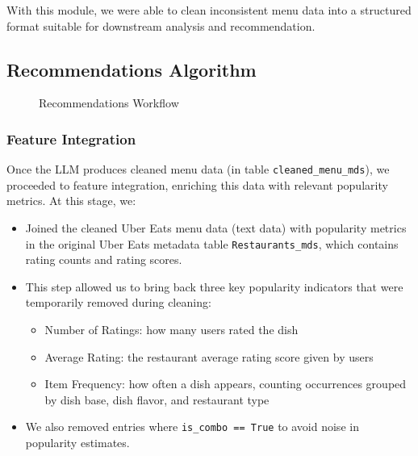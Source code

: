 \documentclass[
  11pt,
  a4paper,
  DIV=11,
  numbers=noendperiod]{scrartcl}
\providecommand{\tightlist}{%
  \setlength{\itemsep}{0pt}\setlength{\parskip}{0pt}}\usepackage{longtable,booktabs,array}
\begin{document}
With this module, we were able to clean inconsistent menu data into a
structured format suitable for downstream analysis and recommendation.

\subsection{Recommendations Algorithm}\label{recommendations-algorithm}

\begin{figure}

\caption{\label{fig-rec-flow}Recommendations Workflow}


\end{figure}%

\subsubsection{Feature Integration}\label{feature-integration}

Once the LLM produces cleaned menu data (in table
\texttt{cleaned\_menu\_mds}), we proceeded to feature integration,
enriching this data with relevant popularity metrics. At this stage, we:

\begin{itemize}
\tightlist
\item
  Joined the cleaned Uber Eats menu data (text data) with popularity
  metrics in the original Uber Eats metadata table
  \texttt{Restaurants\_mds}, which contains rating counts and rating
  scores.
\item
  This step allowed us to bring back three key popularity indicators
  that were temporarily removed during cleaning:

  \begin{itemize}
  \tightlist
  \item
    Number of Ratings: how many users rated the dish
  \item
    Average Rating: the restaurant average rating score given by users
  \item
    Item Frequency: how often a dish appears, counting occurrences
    grouped by dish base, dish flavor, and restaurant type
  \end{itemize}
\item
  We also removed entries where \texttt{is\_combo\ ==\ True} to avoid
  noise in popularity estimates.
\end{itemize}
\end{document}
